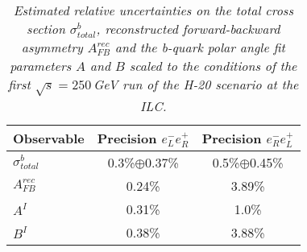         \begin{table}
        \begin{center}
        \begin{tabular}{l c c}
        \hline
	Observable & Precision $e^-_Le^+_R$ & Precision $e^-_Re^+_L$\\
	\hline
	$\sigma^b_{total} $  & 0.3\%$\oplus$0.37\%   & 0.5\%$\oplus$0.45\% \\
	$A_{FB}^{rec} $& 0.24\%  & 3.89\% \\
	$A^I $ 			& 0.31\% & 1.0\% \\
	$B^I $ 			& 0.38\% & 3.88\% \\
		
        \hline
        \end{tabular}
        \end{center}
        \caption{\sl Estimated relative uncertainties on the total cross section $\sigma^b_{total}$, reconstructed forward-backward asymmetry $A_{FB}^{rec}$ and the b-quark polar angle fit parameters $A$ and $B$ scaled to the conditions of the first $\sqrt{s}=250$\,GeV run of the H-20 scenario at the ILC. }
        \label{table:bbbarfinal}
        \end{table}
